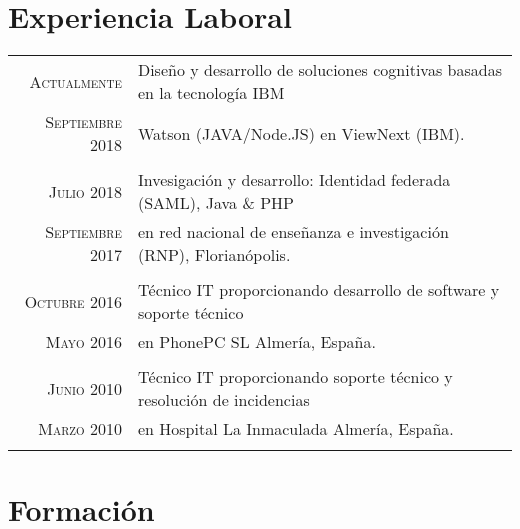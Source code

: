 \documentclass[a4paper,10pt]{article}
\begin{document}
\section*{Experiencia Laboral}
\begin{tabular}{r|p{11cm}}

\textsc {Actualmente} & Diseño y desarrollo de soluciones cognitivas basadas en la tecnología IBM 
\\\textsc{Septiembre 2018} &  Watson (JAVA/Node.JS) en ViewNext (IBM).  
\normalsize \\\multicolumn{2}{c}{} \\


\textsc {Julio 2018} & Invesigación y desarrollo: Identidad federada (SAML), Java \& PHP
\\\textsc{Septiembre 2017} & en red nacional de enseñanza e investigación (RNP), Florianópolis.  \normalsize \\\multicolumn{2}{c}{} \\

\textsc{Octubre} 2016 & Técnico IT proporcionando desarrollo de software y soporte técnico\\\textsc{Mayo 2016} & en PhonePC SL Almería, España. \normalsize \\\multicolumn{2}{c}{} \\


\textsc{Junio} 2010 & Técnico IT proporcionando soporte técnico y resolución de incidencias\\\textsc{Marzo 2010} & en Hospital La Inmaculada Almería, España. \normalsize \\\multicolumn{2}{c}{} \\


\end{tabular}

\section*{Formación}
\end{document}
